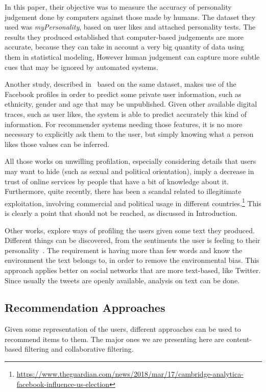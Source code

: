 In this paper, their objective was to measure the accuracy of personality judgement done by computers against those made by humans. The dataset they used was \textit{myPersonality}, based on user likes and attached personality tests. The results they produced established that computer-based judgements are more accurate, because they can take in account a very big quantity of data using them in statistical modeling, However human judgement can capture more subtle cues that may be ignored by automated systems.

Another study, described in~\cite{kosinski2013private} based on the same dataset, makes use of the Facebook profiles in order to predict some private user information, such as ethnicity, gender and age that may be unpublished. Given other available digital traces, such as user likes, the system is able to predict accurately this kind of information. For recommender systems needing those features, it is no more necessary to explicitly ask them to the user, but simply knowing what a person likes those values can be inferred.

All those works on unwilling profilation, especially considering details that users may want to hide (such as sexual and political orientation), imply a decrease in trust of online services by people that have a bit of knowledge about it. Furthermore, quite recently, there has been a scandal related to illegitimate exploitation, involving commercial and political usage in different countries.\footnote{\url{https://www.theguardian.com/news/2018/mar/17/cambridge-analytica-facebook-influence-us-election}} This is clearly a point that should not be reached, as discussed in Introduction.

Other works, explore ways of profiling the users given some text they produced. Different things can be discovered, from the sentiments the user is feeling to their personality~\cite{mairesse2007using}. The requirement is having more than few words and know the environment the text belongs to, in order to remove the environmental bias. This approach applies better on social networks that are more text-based, like Twitter. Since usually the tweets are openly available, analysis on text can be done.

\subsection{Recommendation Approaches}
\label{soaPersonalizationRec}

Given some representation of the users, different approaches can be used to recommend items to them. The major ones we are presenting here are content-based filtering and collaborative filtering.

